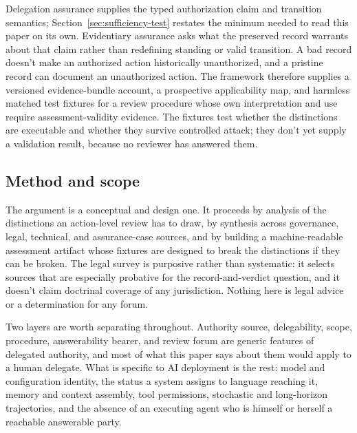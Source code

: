 Delegation assurance \citep{reynolds2026delegationAssurance} supplies the typed authorization claim and transition semantics; Section~\ref{sec:sufficiency-test} restates the minimum needed to read this paper on its own. Evidentiary assurance asks what the preserved record warrants about that claim rather than redefining standing or valid transition. A bad record doesn't make an authorized action historically unauthorized, and a pristine record can document an unauthorized action. The framework therefore supplies a versioned evidence-bundle account, a prospective applicability map, and harmless matched test fixtures for a review procedure whose own interpretation and use require assessment-validity evidence. The fixtures test whether the distinctions are executable and whether they survive controlled attack; they don't yet supply a validation result, because no reviewer has answered them.

\subsection*{Method and scope}

The argument is a conceptual and design one. It proceeds by analysis of the distinctions an action-level review has to draw, by synthesis across governance, legal, technical, and assurance-case sources, and by building a machine-readable assessment artifact whose fixtures are designed to break the distinctions if they can be broken. The legal survey is purposive rather than systematic: it selects sources that are especially probative for the record-and-verdict question, and it doesn't claim doctrinal coverage of any jurisdiction. Nothing here is legal advice or a determination for any forum.

Two layers are worth separating throughout. Authority source, delegability, scope, procedure, answerability bearer, and review forum are generic features of delegated authority, and most of what this paper says about them would apply to a human delegate. What is specific to AI deployment is the rest: model and configuration identity, the status a system assigns to language reaching it, memory and context assembly, tool permissions, stochastic and long-horizon trajectories, and the absence of an executing agent who is himself or herself a reachable answerable party.
